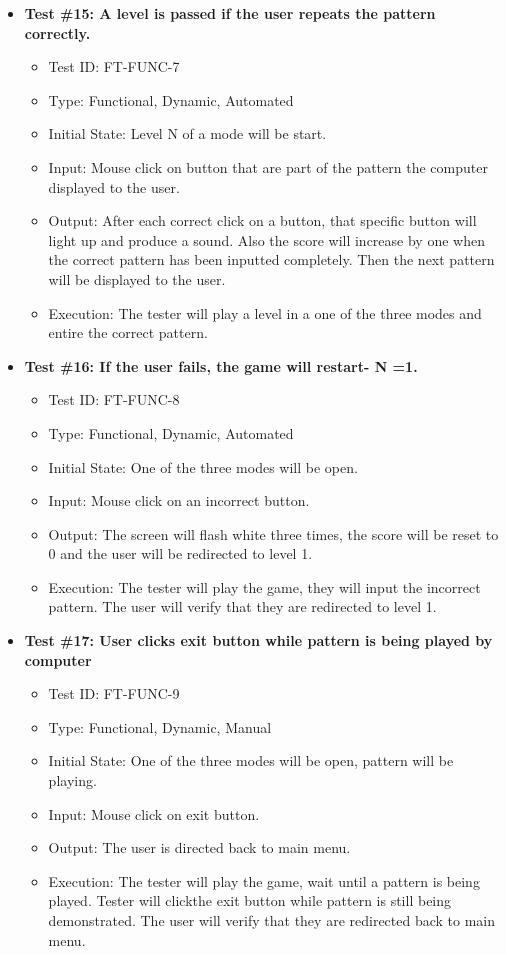 \documentclass[12pt, titlepage]{article}
\begin{document}
\begin{itemize}
\item \textbf{Test \#15: A level is passed if the user repeats the pattern correctly.}
\begin{itemize}
\item Test ID: FT-FUNC-7
\item Type: Functional, Dynamic, Automated		
\item Initial State: Level N of a mode will be start. 					
\item Input: Mouse click on button that are part of the pattern the computer displayed to the user.  	
\item Output: After each correct click on a button, that specific button will light up and produce a sound. Also the score will increase by one when the correct pattern has been inputted completely. Then the next pattern will be displayed to the user. 					
\item Execution: The tester will play a level in a one of the three modes and entire the correct pattern. 
\end{itemize}

\item \textbf{Test \#16: If the user fails, the game will restart- N =1.}
\begin{itemize}
\item Test ID: FT-FUNC-8
\item Type: Functional, Dynamic, Automated	
\item Initial State: One of the three modes will be open. 					
\item Input: Mouse click on an incorrect button. 					
\item Output: The screen will flash white three times, the score will be reset to 0 and the user will be redirected to level 1.					
\item Execution: The tester will play the game, they will input the incorrect pattern. The user will verify that they are redirected to level 1.
\end{itemize}

\item \textbf{Test \#17: User clicks exit button while pattern is being played by computer}
\begin{itemize}
\item Test ID: FT-FUNC-9
\item Type: Functional, Dynamic, Manual	
\item Initial State: One of the three modes will be open, pattern will be playing. 					
\item Input: Mouse click on exit button. 					
\item Output: The user is directed back to main menu.					
\item Execution: The tester will play the game, wait until a pattern is being played. Tester will clickthe exit button while pattern is still being demonstrated. The user will verify that they are redirected back to main menu.
\end{itemize}

\end{itemize}
\end{document}
